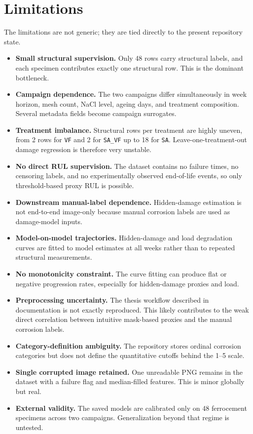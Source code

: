 \documentclass[11pt,a4paper]{article}
\begin{document}
\section{Limitations}

The limitations are not generic; they are tied directly to the present repository state.

\begin{itemize}
  \item \textbf{Small structural supervision.} Only 48 rows carry structural labels, and each specimen contributes exactly one structural row. This is the dominant bottleneck.
  \item \textbf{Campaign dependence.} The two campaigns differ simultaneously in week horizon, mesh count, NaCl level, ageing days, and treatment composition. Several metadata fields become campaign surrogates.
  \item \textbf{Treatment imbalance.} Structural rows per treatment are highly uneven, from 2 rows for \texttt{VF} and 2 for \texttt{SA\_VF} up to 18 for \texttt{SA}. Leave-one-treatment-out damage regression is therefore very unstable.
  \item \textbf{No direct RUL supervision.} The dataset contains no failure times, no censoring labels, and no experimentally observed end-of-life events, so only threshold-based proxy RUL is possible.
  \item \textbf{Downstream manual-label dependence.} Hidden-damage estimation is not end-to-end image-only because manual corrosion labels are used as damage-model inputs.
  \item \textbf{Model-on-model trajectories.} Hidden-damage and load degradation curves are fitted to model estimates at all weeks rather than to repeated structural measurements.
  \item \textbf{No monotonicity constraint.} The curve fitting can produce flat or negative progression rates, especially for hidden-damage proxies and load.
  \item \textbf{Preprocessing uncertainty.} The thesis workflow described in documentation is not exactly reproduced. This likely contributes to the weak direct correlation between intuitive mask-based proxies and the manual corrosion labels.
  \item \textbf{Category-definition ambiguity.} The repository stores ordinal corrosion categories but does not define the quantitative cutoffs behind the 1--5 scale.
  \item \textbf{Single corrupted image retained.} One unreadable PNG remains in the dataset with a failure flag and median-filled features. This is minor globally but real.
  \item \textbf{External validity.} The saved models are calibrated only on 48 ferrocement specimens across two campaigns. Generalization beyond that regime is untested.
\end{itemize}
\end{document}
